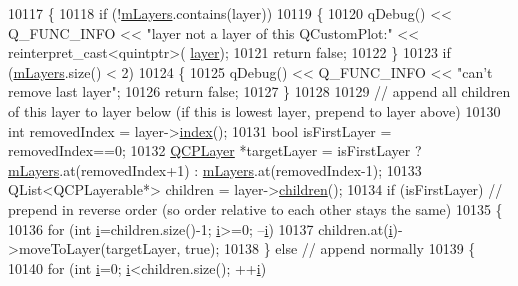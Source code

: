 \begin{DoxyCode}
10117 \{
10118   \textcolor{keywordflow}{if} (!\hyperlink{class_q_custom_plot_a72ee313041b873d76c198793ce7e6c37}{mLayers}.contains(layer))
10119   \{
10120     qDebug() << Q\_FUNC\_INFO << \textcolor{stringliteral}{"layer not a layer of this QCustomPlot:"} << \textcolor{keyword}{reinterpret\_cast<}quintptr\textcolor{keyword}{>}(
      \hyperlink{class_q_custom_plot_aac492da01782820454e9136a8db28182}{layer});
10121     \textcolor{keywordflow}{return} \textcolor{keyword}{false};
10122   \}
10123   \textcolor{keywordflow}{if} (\hyperlink{class_q_custom_plot_a72ee313041b873d76c198793ce7e6c37}{mLayers}.size() < 2)
10124   \{
10125     qDebug() << Q\_FUNC\_INFO << \textcolor{stringliteral}{"can't remove last layer"};
10126     \textcolor{keywordflow}{return} \textcolor{keyword}{false};
10127   \}
10128   
10129   \textcolor{comment}{// append all children of this layer to layer below (if this is lowest layer, prepend to layer above)}
10130   \textcolor{keywordtype}{int} removedIndex = layer->\hyperlink{class_q_c_p_layer_ad5d7010829a6b99f326b07d7e37c8c99}{index}();
10131   \textcolor{keywordtype}{bool} isFirstLayer = removedIndex==0;
10132   \hyperlink{class_q_c_p_layer}{QCPLayer} *targetLayer = isFirstLayer ? \hyperlink{class_q_custom_plot_a72ee313041b873d76c198793ce7e6c37}{mLayers}.at(removedIndex+1) : 
      \hyperlink{class_q_custom_plot_a72ee313041b873d76c198793ce7e6c37}{mLayers}.at(removedIndex-1);
10133   QList<QCPLayerable*> children = layer->\hyperlink{class_q_c_p_layer_a94c2f0100e48cefad2de8fe0fbb03c27}{children}();
10134   \textcolor{keywordflow}{if} (isFirstLayer) \textcolor{comment}{// prepend in reverse order (so order relative to each other stays the same)}
10135   \{
10136     \textcolor{keywordflow}{for} (\textcolor{keywordtype}{int} \hyperlink{_comparision_pictures_2_createtest_image_8m_a6f6ccfcf58b31cb6412107d9d5281426}{i}=children.size()-1; \hyperlink{_comparision_pictures_2_createtest_image_8m_a6f6ccfcf58b31cb6412107d9d5281426}{i}>=0; --\hyperlink{_comparision_pictures_2_createtest_image_8m_a6f6ccfcf58b31cb6412107d9d5281426}{i})
10137       children.at(\hyperlink{_comparision_pictures_2_createtest_image_8m_a6f6ccfcf58b31cb6412107d9d5281426}{i})->moveToLayer(targetLayer, \textcolor{keyword}{true});
10138   \} \textcolor{keywordflow}{else}  \textcolor{comment}{// append normally}
10139   \{
10140     \textcolor{keywordflow}{for} (\textcolor{keywordtype}{int} \hyperlink{_comparision_pictures_2_createtest_image_8m_a6f6ccfcf58b31cb6412107d9d5281426}{i}=0; \hyperlink{_comparision_pictures_2_createtest_image_8m_a6f6ccfcf58b31cb6412107d9d5281426}{i}<children.size(); ++\hyperlink{_comparision_pictures_2_createtest_image_8m_a6f6ccfcf58b31cb6412107d9d5281426}{i})

\end{DoxyCode}

